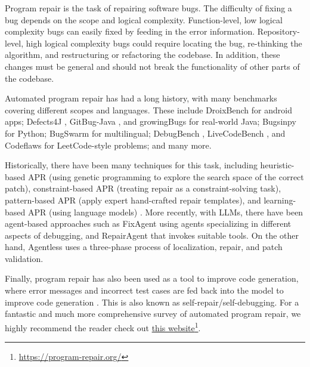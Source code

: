 Program repair is the task of repairing software bugs. The difficulty of fixing a bug depends on the scope and logical complexity. Function-level, low logical complexity bugs can easily fixed by feeding in the error information. Repository-level, high logical complexity bugs could require locating the bug, re-thinking the algorithm, and restructuring or refactoring the codebase. In addition, these changes must be general and should not break the functionality of other parts of the codebase.

Automated program repair has had a long history, with many benchmarks covering different scopes and languages. These include DroixBench \citep{tan2018repairing} for android apps; Defects4J \citep{just2014defects4j}, GitBug-Java \citep{gitbugjava}, and growingBugs \citep{GrowingBugsICSE21, GrowingBugsTSE2022, NaturalnessOfBugsFSE2022} for real-world Java; Bugsinpy \citep{widyasari2020bugsinpy} for Python; BugSwarm \citep{tomassi2019bugswarm} for multilingual; DebugBench \citep{hu2024leveraging}, LiveCodeBench \citep{jain2024livecodebenchholisticcontaminationfree}, and Codeflaws \citep{tan2017codeflaws} for LeetCode-style problems; and many more.

Historically, there have been many techniques for this task, including heuristic-based APR (using genetic programming to explore the search space of the correct patch), constraint-based APR (treating repair as a constraint-solving task), pattern-based APR (apply expert hand-crafted repair templates), and learning-based APR (using language models) \citep{zhang2024systematic}.
More recently, with LLMs, there have been agent-based approaches such as FixAgent \citep{lee2024unified} using agents specializing in different aspects of debugging, and RepairAgent \citep{bouzenia2024repairagent} that invokes suitable tools. On the other hand, Agentless \citep{xia2024agentless} uses a three-phase process of localization, repair, and patch validation. 

Finally, program repair has also been used as a tool to improve code generation, where error messages and incorrect test cases are fed back into the model to improve code generation \citep{madaan2023self, chen2024teaching, zhang2023self, olausson2024repair, zhong2024debug, tang2025code}. This is also known as self-repair/self-debugging. For a fantastic and much more comprehensive survey of automated program repair, we highly recommend the reader check out \href{https://program-repair.org/}{this website}\footnote{\url{https://program-repair.org/}}.


